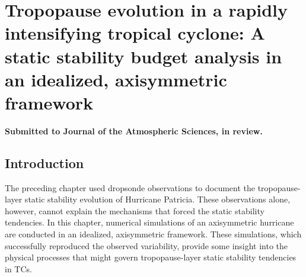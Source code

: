  
\chapter{Tropopause evolution in a rapidly intensifying tropical cyclone: A static stability budget analysis in an idealized, axisymmetric framework}
\label{chapter:modeling}
\resetfootnote %

\textbf{Submitted to Journal of the Atmospheric Sciences, in review.}

\section{Introduction}

The preceding chapter used dropsonde observations to document the tropopause-layer static stability evolution of Hurricane Patricia.
These observations alone, however, cannot explain the mechanisms that forced the static stability tendencies.
In this chapter, numerical simulations of an axisymmetric hurricane are conducted in an idealized, axisymmetric framework.
These simulations, which successfully reproduced the observed variability, provide some insight into the physical processes that might govern tropopause-layer static stability tendencies in TCs.

